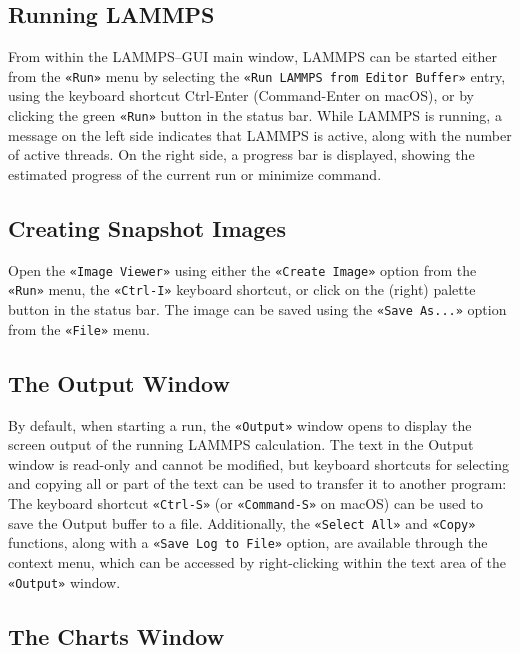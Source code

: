 \documentclass[9pt,tutorial]{livecoms}
\newcommand{\lmpcmd}[1]{\hspace{0pt}\colorbox{listing}{\textcolor{command}{\small{#1}}}\hspace{0pt}} %
\newcommand{\guicmd}[1]{\textcolor{command}{\texttt{«#1»}}} %
\begin{document}
\begin{appendices}
\subsection{Running LAMMPS}


From within the LAMMPS--GUI main window, LAMMPS can be started either from
the \guicmd{Run} menu by selecting the \guicmd{Run LAMMPS from Editor Buffer} entry,
using the keyboard shortcut Ctrl-Enter (Command-Enter on macOS), or by clicking the
green \guicmd{Run} button in the status bar.  While LAMMPS is running, a message on
the left side indicates that LAMMPS is active, along with the number of active threads.
On the right side, a progress bar is displayed, showing the estimated progress
of the current \lmpcmd{run} or \lmpcmd{minimize} command.

\subsection{Creating Snapshot Images}

Open the \guicmd{Image Viewer} using either the \guicmd{Create Image} option
from the \guicmd{Run} menu, the \guicmd{Ctrl-I} keyboard shortcut,
or click on the (right) palette button in the status bar. The image
can be saved using the \guicmd{Save As...} option from the \guicmd{File} menu.

\subsection{The Output Window}

By default, when starting a run, the \guicmd{Output} window opens to display the screen
output of the running LAMMPS calculation. The text in the Output window is
read-only and cannot be modified, but keyboard shortcuts for selecting and
copying all or part of the text can be used to transfer it to another program:
The keyboard shortcut \guicmd{Ctrl-S} (or \guicmd{Command-S} on {macOS}) can
be used to save the Output buffer to a file. Additionally, the \guicmd{Select All}
and \guicmd{Copy} functions, along with a \guicmd{Save Log to File} option, are available
through the context menu, which can be accessed by right-clicking within the text area of the
\guicmd{Output} window.

\subsection{The Charts Window}


\end{appendices}
\end{document}
